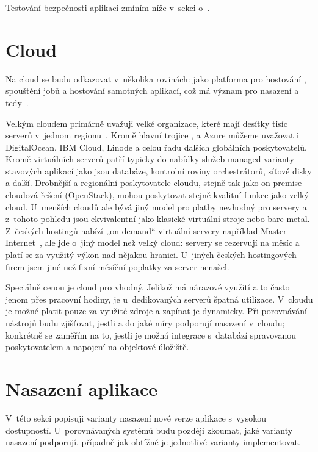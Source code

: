 
        Testování bezpečnosti aplikací zmíním níže v~sekci o~.

    \section*{Cloud}
        Na cloud se budu odkazovat v~několika rovinách: jako platforma pro hostování \CI, spouštění jobů a hostování samotných aplikací, což má význam pro nasazení a tedy~\CD.

        Velkým cloudem primárně uvažuji velké organizace, které mají desítky tisíc serverů v~jednom regionu~\cite{pier-cloud}. Kromě hlavní trojice ,  a Azure můžeme uvažovat i DigitalOcean, IBM Cloud, Linode a celou řadu dalších globálních poskytovatelů. Kromě virtuálních serverů patří typicky do nabídky služeb managed varianty stavových aplikací jako jsou databáze, kontrolní roviny orchestrátorů, síťové disky a další. Drobnější a regionální poskytovatele cloudu, stejně tak jako on-premise cloudová řešení (OpenStack), mohou poskytovat stejně kvalitní funkce jako velký cloud. U~menších cloudů ale bývá jiný model pro platby nevhodný pro \CI servery a z~tohoto pohledu jsou ekvivalentní jako klasické virtuální stroje nebo bare metal. Z~českých hostingů nabízí „on-demand“ virtuální servery například Master Internet~\cite{master-pricing}, ale jde o~jiný model než velký cloud: servery se rezervují na měsíc a platí se za využitý výkon nad nějakou hranici. U~jiných českých hostingových firem jsem jiné než fixní měsíční poplatky za server nenašel.

        Speciálně cenou je cloud pro \CI vhodný. Jelikož \CI má nárazové využití a to často jenom přes pracovní hodiny, je u~dedikovaných serverů špatná utilizace. V~cloudu je možné platit pouze za využité zdroje a zapínat je dynamicky. Při porovnávání \CI nástrojů budu zjišťovat, jestli a do jaké míry podporují nasazení v~cloudu; konkrétně se zaměřím na to, jestli je možná integrace s~databází spravovanou poskytovatelem a napojení na objektové úložiště.

    \section*{Nasazení aplikace}
        V~této sekci popisuji varianty nasazení nové verze aplikace s~vysokou dostupností. U~porovnávaných \CICD systémů budu později zkoumat, jaké varianty nasazení podporují, případně jak obtížné je jednotlivé varianty implementovat.

